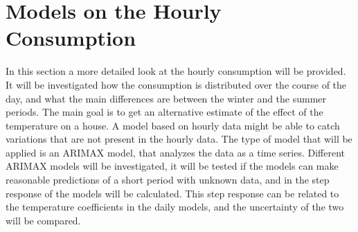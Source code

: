 \chapter{Models on the Hourly Consumption}
\label{chap: hourly}
In this section a more detailed look at the hourly consumption will be provided. It will be investigated how the consumption is distributed over the course of the day, and what the main differences are between the winter and the summer periods. The main goal is to get an alternative estimate of the effect of the temperature on a house. A model based on hourly data might be able to catch variations that are not present in the hourly data. The type of model that will be applied is an ARIMAX model, that analyzes the data as a time series. Different ARIMAX models will be investigated, it will be tested if the models can make reasonable predictions of a short period with unknown data, and in the step response of the models will be calculated. This step response can be related to the temperature coefficients in the daily models, and the uncertainty of the two will be compared.




